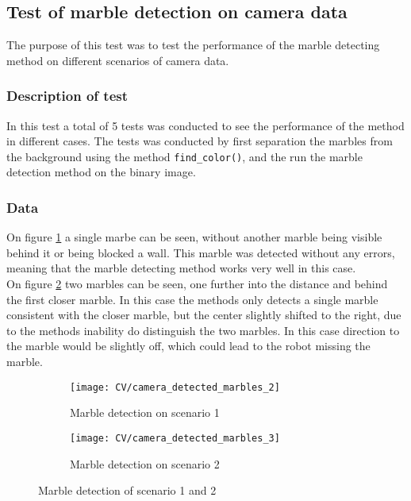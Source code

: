 \documentclass[../Head/Main.tex]{subfiles}
\begin{document}
\subsection{Test of marble detection on camera data}
\label{subsec:test_cv_marble}
The purpose of this test was to test the performance of the marble detecting method on different scenarios of camera data.
\subsubsection*{Description of test}
In this test a total of 5 tests was conducted to see the performance of the method in different cases. The tests was conducted by first separation the marbles from the background using the method \texttt{find\_color()}, and the run the marble detection method on the binary image.	

\subsubsection*{Data}
On figure \ref{fig:md_1} a single marbe can be seen, without another marble being visible behind it or being blocked a wall. This marble was detected without any errors, meaning that the marble detecting method works very well in this case.\\
On figure \ref{fig:md_2} two marbles can be seen, one further into the distance and behind the first closer marble. In this case the methods only detects a single marble consistent with the closer marble, but the center slightly shifted to the right, due to the methods inability do distinguish the two marbles. In this case direction to the marble would be slightly off, which could lead to the robot missing the marble.\\   
\begin{figure}[H]
	\centering
	\begin{subfigure}[b]{0.45\textwidth}
		\centering
		\texttt{[image: CV/camera\_detected\_marbles\_2]}
		\caption{Marble detection on scenario 1}
		\label{fig:md_1}
	\end{subfigure}
	\hfill
	\begin{subfigure}[b]{0.45\textwidth}
		\centering
		\texttt{[image: CV/camera\_detected\_marbles\_3]}
		\caption{Marble detection on scenario 2}
	\end{subfigure}
	\caption{Marble detection of scenario 1 and 2}
	\label{fig:md_2}
\end{figure}
\end{document}
